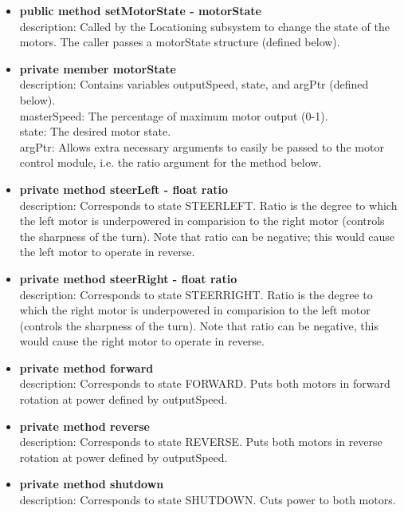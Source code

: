 \documentclass[11pt]{article}
\begin{document}
\begin{itemize}
    \item \textbf{public method setMotorState - motorState} \\ description: Called by the Locationing subsystem to change the state of the motors. The caller passes a motorState structure (defined below).
    \item \textbf{private member motorState} \\ description: Contains variables outputSpeed, state, and argPtr (defined below). \\
    masterSpeed: The percentage of maximum motor output (0-1). \\
    state: The desired motor state. \\
    argPtr: Allows extra necessary arguments to easily be passed to the motor control module, i.e. the ratio argument for the method below.
    \item \textbf{private method steerLeft - float ratio} \\ 
    description: Corresponds to state STEERLEFT. Ratio is the degree to which the left motor is underpowered in comparision to the right motor (controls the sharpness of the turn). Note that ratio can be negative; this would cause the left motor to operate in reverse.
    \item \textbf{private method steerRight - float ratio} \\ 
    description: Corresponds to state STEERRIGHT. Ratio is the degree to which the right motor is underpowered in comparision to the left motor (controls the sharpness of the turn). Note that ratio can be negative, this would cause the right motor to operate in reverse.
    \item \textbf{private method forward} \\ 
    description: Corresponds to state FORWARD. Puts both motors in forward rotation at power defined by outputSpeed.
    \item \textbf{private method reverse} \\ 
    description: Corresponds to state REVERSE. Puts both motors in reverse rotation at power defined by outputSpeed.
    \item \textbf{private method shutdown} \\ 
    description: Corresponds to state SHUTDOWN. Cuts power to both motors.
\end{itemize}
\end{document}

